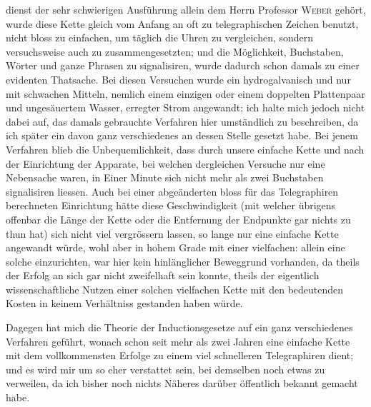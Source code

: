 \noindent dienst der sehr schwierigen Ausführung allein dem Herrn Professor \textsc{Weber} gehört, wurde diese Kette gleich vom Anfang an oft zu telegraphischen Zeichen benutzt, nicht bloss zu einfachen, um täglich die Uhren zu vergleichen, sondern versuchsweise auch zu zusammengesetzten; und die Möglichkeit, Buchstaben, Wörter und ganze Phrasen zu signalisiren, wurde dadurch schon damals zu einer evidenten Thatsache. Bei diesen Versuchen wurde ein hydrogalvanisch und nur mit schwachen Mitteln, nemlich einem einzigen oder einem doppelten Plattenpaar und ungesäuertem Wasser, erregter Strom angewandt; ich halte mich jedoch nicht dabei auf, das damals gebrauchte Verfahren hier umständlich zu beschreiben, da ich später ein davon ganz verschiedenes an dessen Stelle gesetzt habe. Bei jenem Verfahren blieb die Unbequemlichkeit, dass durch unsere einfache Kette und nach der Einrichtung der Apparate, bei welchen dergleichen Versuche nur eine Nebensache waren, in Einer Minute sich nicht mehr als zwei Buchstaben signalisiren liessen. Auch bei einer abgeänderten bloss für das Telegraphiren berechneten Einrichtung hätte diese Geschwindigkeit (mit welcher übrigens offenbar die Länge der Kette oder die Entfernung der Endpunkte gar nichts zu thun hat) sich nicht viel vergrössern lassen, so lange nur eine einfache Kette angewandt würde, wohl aber in hohem Grade mit einer vielfachen: allein eine solche einzurichten, war hier kein hinlänglicher Beweggrund vorhanden, da theils der Erfolg an sich gar nicht zweifelhaft sein konnte, theils der eigentlich wissenschaftliche Nutzen einer solchen vielfachen Kette mit den bedeutenden Kosten in keinem Verhältniss gestanden haben würde.

Dagegen hat mich die Theorie der Inductionsgesetze auf ein ganz verschiedenes Verfahren geführt, wonach schon seit mehr als zwei Jahren eine einfache Kette mit dem vollkommensten Erfolge zu einem viel schnelleren Telegraphiren dient; und es wird mir um so eher verstattet sein, bei demselben noch etwas zu verweilen, da ich bisher noch nichts Näheres darüber öffentlich bekannt gemacht habe.

